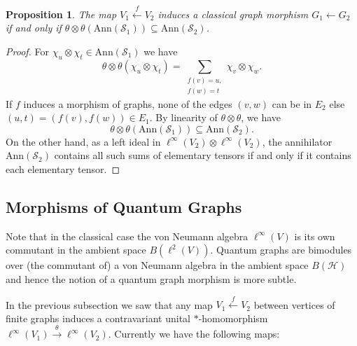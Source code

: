 \documentclass[12pt]{article}
\newtheorem{proposition}[theorem]{Proposition}
\theoremstyle{definition}
\newcommand{\mc}[1]{\mathcal{#1}}
\newcommand{\<}{\langle}
\renewcommand{\>}{\rangle}
\newcommand{\Ann}{\text{Ann}}
\begin{document}
\begin{proposition}\label{thm:classical-morphism-1}
    The map $V_1 \overset f\leftarrow V_2$ induces a classical graph morphism $G_1 \leftarrow G_2$ if and only if $\theta \otimes \theta (\Ann(\mc S_1)) \subseteq \Ann(\mc S_2)$. 
\end{proposition}
\begin{proof}
    For $\chi_u \otimes \chi_t \in \Ann(\mc S_1)$ we have
    \[
    \theta \otimes \theta(\chi_u \otimes \chi_t) = \sum_{\substack{f(v) = u,\\ f(w) = t}} \chi_v \otimes \chi_w.
    \]
    If $f$ induces a morphism of graphs, none of the edges $(v,w)$ can be in $E_2$ else $(u,t) = (f(v),f(w)) \in E_1$. By linearity of $\theta \otimes \theta$, we have 
    \[
    \theta \otimes \theta (\Ann(\mc S_1)) \subseteq \Ann(\mc S_2).
    \]
    On the other hand, as a left ideal in $\ell^\infty(V_2) \otimes \ell^\infty(V_2)$, the annihilator $\Ann(\mc S_2)$ contains all such sums of elementary tensors if and only if it contains each elementary tensor. 
\end{proof}

\subsection{Morphisms of Quantum Graphs} \label{subsec: morphisms of qgraphs}

Note that in the classical case the von Neumann algebra $\ell^\infty (V)$ is its own commutant in the ambient space $B(\ell^2(V))$. Quantum graphs are bimodules over (the commutant of) a von Neumann algebra in the ambient space $B(\mc H)$ and hence the notion of a quantum graph morphism is more subtle. 

In the previous subsection we saw that any map $V_1 \overset f \leftarrow V_2$ between vertices of finite graphs induces a contravariant unital $*$-homomorphism $\ell^\infty(V_1) \overset{\theta}{\to} \ell^\infty(V_2)$. Currently we have the following maps:
\begin{center}
\end{center}
\end{document}
